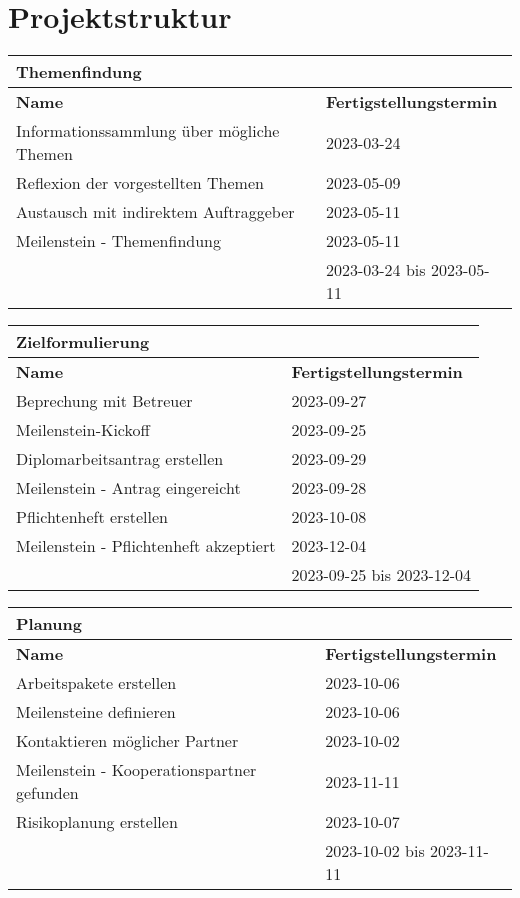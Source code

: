 \chapter{Projektstruktur}
\begin{table}[!ht]
	\centering
	\begin{tabular}{|l|l|}
		\hline
		\textbf{Themenfindung} & ~ \\ \hline
		\textbf{Name} & \textbf{Fertigstellungstermin} \\ \hline
		Informationssammlung über mögliche Themen & 2023-03-24 \\ \hline
		Reflexion der vorgestellten Themen & 2023-05-09 \\ \hline
		Austausch mit indirektem Auftraggeber & 2023-05-11 \\ \hline
		Meilenstein - Themenfindung & 2023-05-11 \\ \hline
		~ & 2023-03-24 bis 2023-05-11 \\ \hline
	\end{tabular}
\end{table}

\begin{table}[!ht]
	\centering
	\begin{tabular}{|l|l|}
		\hline
		\textbf{Zielformulierung} & ~ \\ \hline
		\textbf{Name} & \textbf{Fertigstellungstermin} \\ \hline
		Beprechung mit Betreuer & 2023-09-27 \\ \hline
		Meilenstein-Kickoff & 2023-09-25 \\ \hline
		Diplomarbeitsantrag erstellen & 2023-09-29 \\ \hline
		Meilenstein - Antrag eingereicht & 2023-09-28 \\ \hline
		Pflichtenheft erstellen & 2023-10-08 \\ \hline
		Meilenstein - Pflichtenheft akzeptiert & 2023-12-04 \\ \hline
		~ & 2023-09-25 bis 2023-12-04 \\ \hline
	\end{tabular}
\end{table}

\begin{table}[!ht]
	\centering
	\begin{tabular}{|l|l|}
		\hline
		\textbf{Planung} & ~ \\ \hline
		\textbf{Name} & \textbf{Fertigstellungstermin} \\ \hline
		Arbeitspakete erstellen & 2023-10-06 \\ \hline
		Meilensteine definieren & 2023-10-06 \\ \hline
		Kontaktieren möglicher Partner & 2023-10-02 \\ \hline
		Meilenstein - Kooperationspartner gefunden & 2023-11-11 \\ \hline
		Risikoplanung erstellen & 2023-10-07 \\ \hline
		~ & 2023-10-02 bis 2023-11-11 \\ \hline
	\end{tabular}
\end{table}

